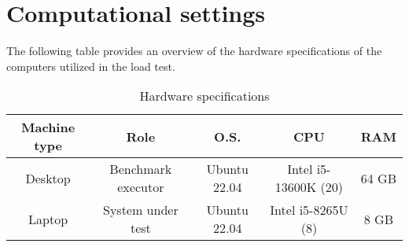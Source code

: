 \clearpage

\section{Computational settings}

The following table provides an overview of the hardware specifications of the computers utilized in the load test.

\begin{table}[H]
	\caption{Hardware specifications}
\begin{center}
	\begin{tabular}{ ccccc }
		\hline
		Machine type & Role & O.S. & CPU & RAM \\
		\hline
		Desktop & Benchmark executor & Ubuntu 22.04 & Intel i5-13600K (20) & 64 GB \\
		Laptop & System under test & Ubuntu 22.04 & Intel i5-8265U (8) & 8 GB \\
		\hline
	\end{tabular}
\end{center}
\end{table}
